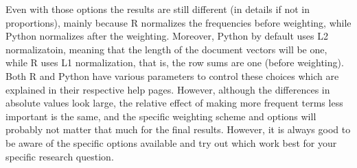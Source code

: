 Even with those options the results are still different (in details if not in proportions),
mainly because R normalizes the frequencies before weighting, while Python normalizes after the weighting.
Moreover, Python by default uses L2 normalizatoin, meaning that the length of the document vectors will be one,
while R uses L1 normalization, that is, the row sums are one (before weighting).
Both R and Python have various parameters to control these choices which are explained in their respective help pages.
However, although the differences in absolute values look large, the relative effect of making more frequent terms less important is the same,
and the specific weighting scheme and options will probably not matter that much for the final results.
However, it is always good to be aware of the specific options available and try out which work best for your specific research question.




